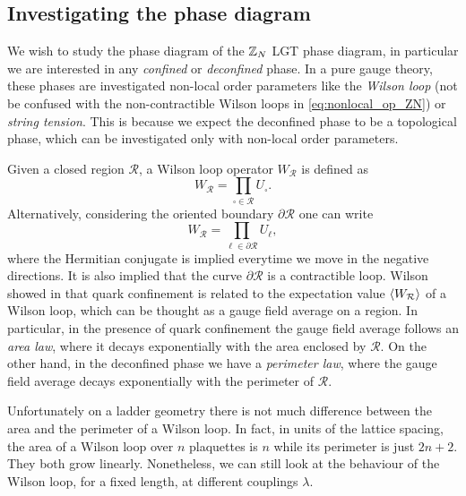 \subsection{Investigating the phase diagram}%
\label{sub:investigating_the_phase_diagram}

We wish to study the phase diagram of the $\mathbb{Z}_N$ LGT phase diagram, in particular we are interested in any \emph{confined} or \emph{deconfined} phase.
In a pure gauge theory, these phases are investigated non-local order parameters like the \emph{Wilson loop} (not be confused with the non-contractible Wilson loops in \eqref{eq:nonlocal_op_ZN}) or \emph{string tension}.
This is because we expect the deconfined phase to be a topological phase, which can be investigated only with non-local order parameters.

Given a closed region $\mathcal{R}$, a Wilson loop operator $W_{\mathcal{R}}$ is defined as
\begin{equation}
    W_{\mathcal{R}} = \prod_{\square \in \mathcal{R}} U_{\square}.
    \label{eq:closed_wilson_loop}
\end{equation}
Alternatively, considering the oriented boundary $\partial \mathcal{R}$ one can write
\begin{equation}
    W_{\mathcal{R}} = \prod_{\ell \in \partial \mathcal{R}} U_{\ell},
\end{equation}
where the Hermitian conjugate is implied everytime we move in the negative directions.
It is also implied that the curve $\partial \mathcal{R}$ is a contractible loop.
Wilson showed in \cite{wilson1974confinement} that quark confinement is related to the expectation value $\ev{W_{\mathcal{R}}}$ of a Wilson loop, which can be thought as a gauge field average on a region.
In particular, in the presence of quark confinement the gauge field average follows an \emph{area law}, where it decays exponentially with the area enclosed by $\mathcal{R}$.
On the other hand, in the deconfined phase we have a \emph{perimeter law}, where the gauge field average decays exponentially with the perimeter of $\mathcal{R}$.

Unfortunately on a ladder geometry there is not much difference between the area and the perimeter of a Wilson loop.
In fact, in units of the lattice spacing, the area of a Wilson loop over $n$ plaquettes is $n$ while its perimeter is just $2n+2$.
They both grow linearly.
Nonetheless, we can still look at the behaviour of the Wilson loop, for a fixed length, at different couplings $\lambda$.

